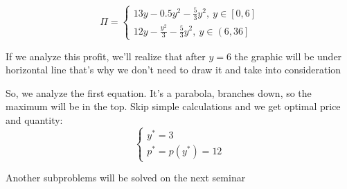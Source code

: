 \documentclass[a4paper, 10pt]{article}
\begin{document}
\begin{equation*}
    \Pi=\begin{cases}
        13y-0.5y^2-\displaystyle\frac{5}{3}y^2,\ y\in\left[0,6\right]\\
        12y-\displaystyle\frac{y^2}{3}-\frac{5}{3}y^2,\ y\in\left(6,36\right]
    \end{cases}
\end{equation*}

If we analyze this profit, we'll realize that after $y=6$ the graphic will be under horizontal line that's why we don't need to draw it and take into consideration

So, we analyze the first equation. It's a parabola, branches down, so the maximum will be in the top. Skip simple calculations and we get optimal price and quantity:
\begin{equation*}
    \begin{cases}
        y^*=3\\
        p^*=p(y^*)=12
    \end{cases}
\end{equation*}

Another subproblems will be solved on the next seminar
\end{document}
